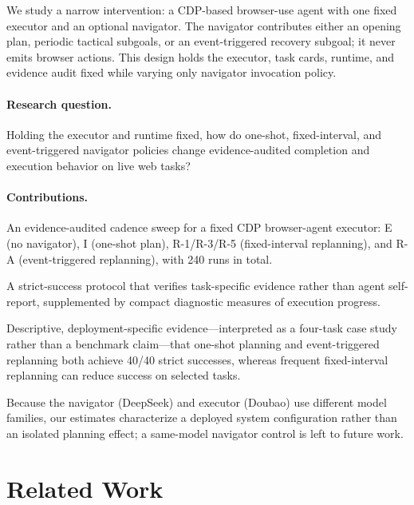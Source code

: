 \documentclass{llncs}
\begin{document}
We study a narrow intervention: a CDP-based browser-use agent with one fixed
executor and an optional navigator. The navigator contributes either an opening
plan, periodic tactical subgoals, or an event-triggered recovery subgoal; it never
emits browser actions. This design holds the executor, task cards, runtime, and
evidence audit fixed while varying only navigator invocation policy.

\paragraph{Research question.} Holding the executor and runtime fixed, how do
one-shot, fixed-interval, and event-triggered navigator policies change
evidence-audited completion and execution behavior on live web tasks?

\paragraph{Contributions.}
An evidence-audited cadence sweep for a fixed CDP browser-agent
executor: E (no navigator), I (one-shot plan), R-1/R-3/R-5
(fixed-interval replanning), and R-A (event-triggered replanning), with
240 runs in total.

A strict-success protocol that verifies task-specific evidence rather
than agent self-report, supplemented by compact diagnostic measures of
execution progress.
  
Descriptive, deployment-specific evidence---interpreted as a four-task
case study rather than a benchmark claim---that one-shot planning and
event-triggered replanning both achieve 40/40 strict successes, whereas
frequent fixed-interval replanning can reduce success on selected tasks.


Because the navigator (DeepSeek) and executor (Doubao) use different model
families, our estimates characterize a deployed system configuration rather
than an isolated planning effect; a same-model navigator control is left to
future work.

\section{Related Work}
\end{document}

